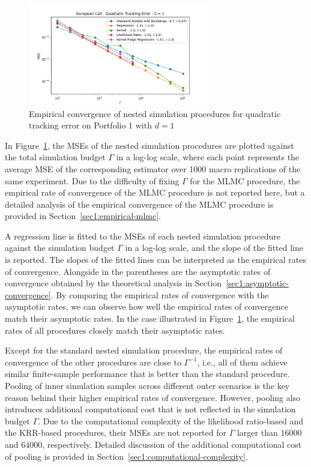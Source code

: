 \begin{figure}[ht!]
    \centering
    \includegraphics[width=0.7\textwidth]{./project1/figures/figure1.png}
    \caption{Empirical convergence of nested simulation procedures for quadratic tracking error on Portfolio 1 with $d=1$}
    \label{fig1:compareAll} 
\end{figure}
In Figure~\ref{fig1:compareAll}, the MSEs of the nested simulation procedures are plotted against the total simulation budget $\Gamma$ in a log-log scale, where each point represents the average MSE of the corresponding estimator over \num{1000} macro replications of the same experiment.
Due to the difficulty of fixing $\Gamma$ for the MLMC procedure, the empirical rate of convergence of the MLMC procedure is not reported here, but a detailed analysis of the empirical convergence of the MLMC procedure is provided in Section~\ref{sec1:empirical-mlmc}.

A regression line is fitted to the MSEs of each nested simulation procedure against the simulation budget $\Gamma$ in a log-log scale, and the slope of the fitted line is reported.
The slopes of the fitted lines can be interpreted as the empirical rates of convergence.
Alongside in the parentheses are the asymptotic rates of convergence obtained by the theoretical analysis in Section~\ref{sec1:asymptotic-convergence}.
By comparing the empirical rates of convergence with the asymptotic rates, we can observe how well the empirical rates of convergence match their asymptotic rates.
In the case illustrated in Figure~\ref{fig1:compareAll}, the empirical rates of all procedures closely match their asymptotic rates.

Except for the standard nested simulation procedure, the empirical rates of convergence of the other procedures are close to $\Gamma^{-1}$, i.e., all of them achieve similar finite-sample performance that is better than the standard procedure.
Pooling of inner simulation samples across different outer scenarios is the key reason behind their higher empirical rates of convergence.
However, pooling also introduces additional computational cost that is not reflected in the simulation budget $\Gamma$.
Due to the computational complexity of the likelihood ratio-based and the KRR-based procedures, their MSEs are not reported for $\Gamma$ larger than $\num{16000}$ and $\num{64000}$, respectively.
Detailed discussion of the additional computational cost of pooling is provided in Section~\ref{sec1:computational-complexity}.

